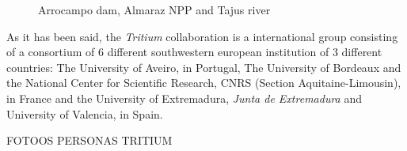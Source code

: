 \begin{figure}[]
 \centering
 \caption{Arrocampo dam, Almaraz NPP and Tajus river}
 \label{fig:Arrocampo}
\end{figure}

As it has been said, the \textit{Tritium} collaboration is a international group consisting of a consortium of 6 different southwestern european institution of 3 different countries: The University of Aveiro, in Portugal, The University of Bordeaux and the National Center for Scientific Research, CNRS  (Section Aquitaine-Limousin), in France and the University of Extremadura, \textit{Junta de Extremadura} and University of Valencia, in Spain.

FOTOOS PERSONAS TRITIUM

